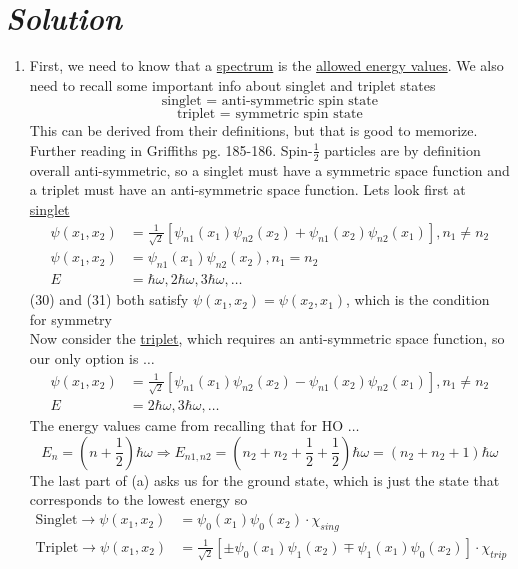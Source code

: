 \documentclass{article}
\begin{document}
\section*{\textit{Solution}} 
\begin{enumerate}[label=\alph*)]
	\item %
	First, we need to know that a \underline{spectrum} is the \underline{allowed energy values}. We also need to recall some important info about singlet and triplet states
	\[ \text{singlet } = \text{ anti-symmetric spin state} \]
	\[ \text{triplet } = \text{ symmetric spin state} \]
	This can be derived from their definitions, but that is good to memorize. Further reading in Griffiths pg. 185-186. Spin-$\frac{1}{2}$ particles are by definition overall anti-symmetric, so a singlet must have a symmetric space function and a triplet must have an anti-symmetric space function. Lets look first at \underline{singlet}
	\begin{align}
		\psi(x_1,x_2) &= \frac{1}{\sqrt{2}}\left[ \psi_{n1}(x_1) \psi_{n2}(x_2) + \psi_{n1}(x_2) \psi_{n2}(x_1)\right],  n_1 \neq n_2  \\
		\psi(x_1,x_2) &= \psi_{n1}(x_1) \psi_{n2}(x_2), n_1 = n_2 \\
		E &= \hbar\omega, 2\hbar\omega, 3\hbar\omega, \dots
	\end{align}
	(30) and (31) both satisfy $ \psi(x_1,x_2) = \psi(x_2,x_1)$, which is the condition for symmetry \\
	Now consider the \underline{triplet}, which requires an anti-symmetric space function, so our only option is $\dots$
	\begin{align}
		\psi(x_1,x_2) &= \frac{1}{\sqrt{2}}\left[ \psi_{n1}(x_1) \psi_{n2}(x_2) - \psi_{n1}(x_2) \psi_{n2}(x_1)\right],  n_1 \neq n_2 \\ 
		E &=  2\hbar\omega, 3\hbar\omega, \dots
	\end{align}
	The energy values came from recalling that for HO $\dots$
	\[ E_n = (n+\frac{1}{2})\hbar\omega \Rightarrow E_{n1,n2} = (n_2+n_2+\frac{1}{2}+\frac{1}{2})\hbar\omega = (n_2+n_2+1)\hbar\omega \]
	The last part of (a) asks us for the ground state, which is just the state that corresponds to the lowest energy so
	\begin{align}
		\text{Singlet} \rightarrow \psi(x_1,x_2) &= \psi_{0}(x_1) \psi_{0}(x_2)\cdot\chi_{sing} \\
		\text{Triplet} \rightarrow \psi(x_1,x_2) &= \frac{1}{\sqrt{2}}\left[ \pm \psi_{0}(x_1) \psi_{1}(x_2) \mp \psi_{1}(x_1) \psi_{0}(x_2)\right]\cdot\chi_{trip}

\end{align}
\end{enumerate}
\end{document}
